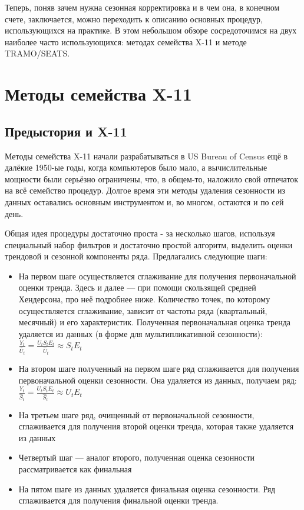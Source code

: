 \documentclass[final,pdftex]{../../template/epsilonj}\usepackage[]{graphicx}\usepackage[]{color}
\begin{document}
Теперь, поняв зачем нужна сезонная корректировка и в чем она, в конечном счете, заключается, можно переходить к описанию основных процедур, использующихся на практике. 
В этом небольшом обзоре сосредоточимся на двух наиболее часто использующихся: методах семейства X-11 и методе TRAMO/SEATS. 

\section{Методы семейства X-11} 
\subsection{Предыстория и X-11}

Методы семейства X-11 начали разрабатываться в US Bureau of Census ещё в далёкие 1950-ые годы, когда компьютеров было мало, а вычислительные мощности были серьёзно ограничены, что, в общем-то, наложило свой отпечаток на всё семейство процедур. Долгое время эти методы удаления сезонности из данных оставались основным инструментом и, во многом, остаются и по сей день. 

Общая идея процедуры достаточно проста - за несколько шагов, используя специальный набор фильтров и достаточно простой алгоритм, выделить оценки трендовой и сезонной компоненты ряда. Предлагались следующие шаги:

\begin{itemize}
\item На первом шаге осуществляется сглаживание для получения первоначальной оценки тренда. Здесь и далее --- при помощи скользящей средней Хендерсона, про неё подробнее ниже.  Количество точек, по которому осуществляется сглаживание, зависит от частоты ряда (квартальный, месячный) и его характеристик. Полученная первоначальная оценка тренда удаляется из данных (в форме для мультипликативной сезонности): $\frac{Y_t}{\hat{U}_t} = \frac{U_t S_t E_t}{\hat{U}_t} \approx S_t E_t$
\item На втором шаге полученный на первом шаге ряд сглаживается для получения первоначальной оценки сезонности. Она удаляется из данных, получаем ряд:  $\frac{Y_t}{\hat{S}_t} = \frac{U_t S_t E_t}{\hat{S}_t} \approx U_t E_t$
\item На третьем шаге ряд, очищенный от первоначальной сезонности, сглаживается для получения второй оценки тренда, которая также удаляется из данных
\item Четвертый шаг --- аналог второго, полученная оценка сезонности рассматривается как финальная
\item На пятом шаге из данных удаляется финальная оценка сезонности. Ряд сглаживается для получения финальной оценки тренда. 
\end{itemize}
\end{document}
